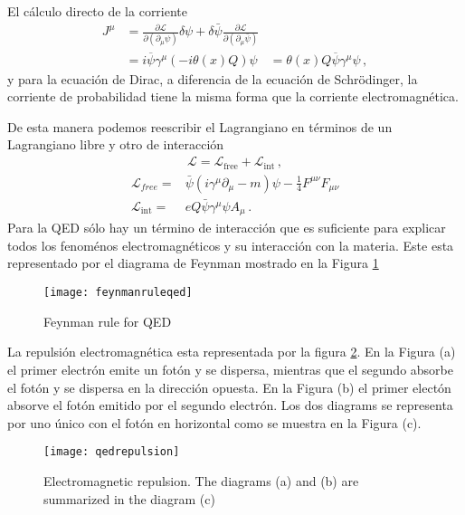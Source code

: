 El cálculo directo de la  corriente 
\begin{align}
  J^\mu&=\frac{\partial\mathcal{L}}{\partial\left(\partial_\mu\psi\right)}\delta\psi+\delta\bar{\psi}\frac{\partial\mathcal{L}}{\partial\left(\partial_\mu\bar{\psi}\right)}\nonumber\\
  &= i\overline{\psi}\gamma^\mu(-i \theta(x) Q ) \psi
  &= \theta(x) Q\overline{\psi}\gamma^\mu \psi\,,
\end{align}
y para la ecuación de Dirac, a diferencia de la ecuación de Schrödinger, la corriente de probabilidad tiene la misma forma que la corriente electromagnética.

De esta manera podemos reescribir el Lagrangiano en términos de un Lagrangiano libre y otro de interacción
\begin{align}
  \mathcal{L}=\mathcal{L}_{\text{free}}+\mathcal{L}_{\text{int}}\,,
\end{align}
\begin{align}
  \mathcal{L}_{free}=&\bar{\psi}\left(i\gamma^\mu\partial_\mu-m\right)\psi-\tfrac{1}{4}F^{\mu\nu}F_{\mu\nu}\nonumber\\
  \mathcal{L}_{\text{int}}=&eQ\bar{\psi}\gamma^\mu\psi A_\mu\,.
\end{align}
Para la QED sólo hay un término de interacción que es suficiente para explicar todos los fenoménos electromagnéticos y su interacción con la materia. Este esta representado por el diagrama de Feynman mostrado en la Figura \ref{fig:feynmanruleqed}

\begin{figure}
  \texttt{[image: feynmanruleqed]} %
  \caption{Feynman rule for QED}
  \label{fig:feynmanruleqed}
\end{figure}

La repulsión electromagnética esta representada por la figura \ref{fig:qedrepulsion}. En la Figura (a) el primer electrón emite un fotón y se dispersa, mientras que el segundo absorbe el fotón y se dispersa en la dirección opuesta. En la Figura (b) el primer electón absorve el fotón emitido por el segundo electrón. Los dos diagrams se representa por uno único con el fotón en horizontal como se muestra en la Figura (c).

\begin{figure}
  \centering
  \texttt{[image: qedrepulsion]}
  \caption{Electromagnetic repulsion. The diagrams (a) and (b) are summarized in the diagram (c)}
  \label{fig:qedrepulsion}
\end{figure}


